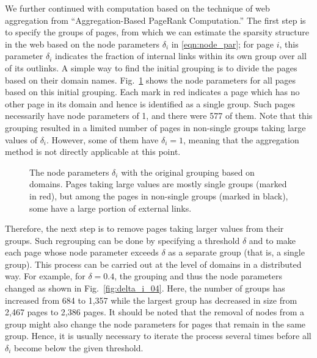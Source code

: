 \documentclass[11pt,draftcls,onecolumn]{IEEEtran}
\newcommand{\fig}[3]{\resizebox{#1}{#2}{\texttt{[image: \#3]}}}
\begin{document}
We further continued with computation based on the technique of web aggregation
from ``Aggregation-Based PageRank Computation.''
The first step is to specify the groups of pages, from which we can estimate the 
sparsity structure in the web based on the node parameters $\delta_i$ in \eqref{eqn:node_par}; 
for page $i$, this parameter $\delta_i$ 
indicates the fraction of internal links within its own group over all of its outlinks. 
A simple way to find the initial grouping is to divide the pages based on their domain names.
Fig.~\ref{fig:delta_i_1} shows the node parameters for all pages based on this initial grouping. 
Each mark in red indicates a page which has no other page in its domain and 
hence is identified as a single group. Such pages necessarily have node parameters of 1, and
there were 577 of them. 
Note that this grouping resulted in a limited 
number of pages in non-single groups taking large values of $\delta_i$. 
However, some of them have $\delta_i=1$, meaning that the aggregation method is not
directly applicable at this point. 

\begin{figure}[t]
  \centering
  \fig{9cm}{!}{delta_i_1.eps}
  \caption{The node parameters $\delta_i$ with the original grouping based on domains.
           Pages taking large values are mostly single groups (marked in red), 
           but among the pages in non-single groups (marked in black), some have 
           a large portion of external links.}
  \label{fig:delta_i_1}
\end{figure}


Therefore, the next step is to remove pages taking larger values from their groups.
Such regrouping can be done by specifying a threshold $\delta$ and to make each page
whose node parameter exceeds $\delta$ as a separate group (that is, a single group). 
This process can be carried out at the level of domains in a distributed way. 
For example, for $\delta=0.4$, the grouping and thus the node parameters 
changed as shown in Fig.~\ref{fig:delta_i_04}. Here, the number of groups has 
increased from 684 to 1,357 while the largest group has decreased
in size from 2,467 pages to 2,386 pages.
It should be noted that the removal of nodes from a group might also change 
the node parameters for pages that remain in the same group. Hence,
it is usually necessary to iterate the process several times
before all $\delta_i$ become below the given threshold. 
\end{document}

